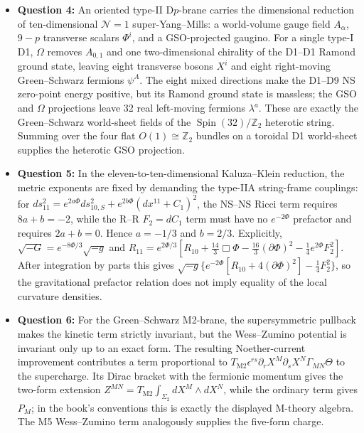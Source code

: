 \documentclass[
  10pt,
  a4paper,
  openany]{book}
\begin{document}
\begin{itemize}
  equivalence of the full string background.
\item
  \textbf{Question 4:} An oriented type-II D\(p\)-brane carries the
  dimensional reduction of ten-dimensional \(\mathcal N=1\)
  super-Yang--Mills: a world-volume gauge field \(A_\alpha\), \(9-p\)
  transverse scalars \(\Phi^i\), and a GSO-projected gaugino. For a
  single type-I D1, \(\Omega\) removes \(A_{0,1}\) and one
  two-dimensional chirality of the D1--D1 Ramond ground state, leaving
  eight transverse bosons \(X^i\) and eight right-moving Green--Schwarz
  fermions \(\psi^A\). The eight mixed directions make the D1--D9 NS
  zero-point energy positive, but its Ramond ground state is massless;
  the GSO and \(\Omega\) projections leave 32 real left-moving fermions
  \(\lambda^a\). These are exactly the Green--Schwarz world-sheet fields
  of the \(\operatorname{Spin}(32)/\mathbb Z_2\) heterotic string.
  Summing over the four flat \(O(1)\cong\mathbb Z_2\) bundles on a
  toroidal D1 world-sheet supplies the heterotic GSO projection.
\item
  \textbf{Question 5:} In the eleven-to-ten-dimensional Kaluza--Klein
  reduction, the metric exponents are fixed by demanding the type-IIA
  string-frame couplings: for
  \(ds_{11}^2=e^{2a\Phi}ds_{10,S}^2+e^{2b\Phi}(dx^{11}+C_1)^2\), the
  NS--NS Ricci term requires \(8a+b=-2\), while the R--R \(F_2=dC_1\)
  term must have no \(e^{-2\Phi}\) prefactor and requires \(2a+b=0\).
  Hence \(a=-1/3\) and \(b=2/3\). Explicitly,
  \(\sqrt{-G}=e^{-8\Phi/3}\sqrt{-g}\) and
  \(R_{11}=e^{2\Phi/3}[R_{10}+\frac{14}{3}\Box\Phi-\frac{16}{3}(\partial\Phi)^2-\frac14e^{2\Phi}F_2^2]\).
  After integration by parts this gives
  \(\sqrt{-g}\{e^{-2\Phi}[R_{10}+4(\partial\Phi)^2]-\frac14F_2^2\}\), so
  the gravitational prefactor relation does not imply equality of the
  local curvature densities.
\item
  \textbf{Question 6:} For the Green--Schwarz M2-brane, the
  supersymmetric pullback makes the kinetic term strictly invariant, but
  the Wess--Zumino potential is invariant only up to an exact form. The
  resulting Noether-current improvement contributes a term proportional
  to
  \(T_{\mathrm{M2}}\epsilon^{rs}\partial_rX^M\partial_sX^N\Gamma_{MN}\Theta\)
  to the supercharge. Its Dirac bracket with the fermionic momentum
  gives the two-form extension
  \(Z^{MN}=T_{\mathrm{M2}}\int_{\Sigma_2}dX^M\wedge dX^N\), while the
  ordinary term gives \(P_M\); in the book's conventions this is exactly
  the displayed M-theory algebra. The M5 Wess--Zumino term analogously
  supplies the five-form charge.

\end{itemize}
\end{document}
